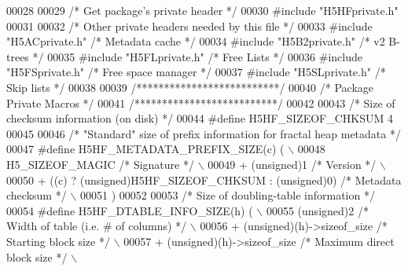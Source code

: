 \begin{DoxyCode}
00028 
00029 \textcolor{comment}{/* Get package's private header */}
00030 \textcolor{preprocessor}{#include "H5HFprivate.h"}
00031 
00032 \textcolor{comment}{/* Other private headers needed by this file */}
00033 \textcolor{preprocessor}{#include "H5ACprivate.h"}    \textcolor{comment}{/* Metadata cache           */}
00034 \textcolor{preprocessor}{#include "H5B2private.h"}    \textcolor{comment}{/* v2 B-trees               */}
00035 \textcolor{preprocessor}{#include "H5FLprivate.h"}    \textcolor{comment}{/* Free Lists                           */}
00036 \textcolor{preprocessor}{#include "H5FSprivate.h"}    \textcolor{comment}{/* Free space manager           */}
00037 \textcolor{preprocessor}{#include "H5SLprivate.h"}    \textcolor{comment}{/* Skip lists               */}
00038 
00039 \textcolor{comment}{/**************************/}
00040 \textcolor{comment}{/* Package Private Macros */}
00041 \textcolor{comment}{/**************************/}
00042 
00043 \textcolor{comment}{/* Size of checksum information (on disk) */}
00044 \textcolor{preprocessor}{#define H5HF\_SIZEOF\_CHKSUM      4}
00045 
00046 \textcolor{comment}{/* "Standard" size of prefix information for fractal heap metadata */}
00047 \textcolor{preprocessor}{#define H5HF\_METADATA\_PREFIX\_SIZE(c) (                                        \(\backslash\)}
00048 \textcolor{preprocessor}{    H5\_SIZEOF\_MAGIC   }\textcolor{comment}{/* Signature */}\textcolor{preprocessor}{                                         \(\backslash\)}
00049 \textcolor{preprocessor}{    + (unsigned)1 }\textcolor{comment}{/* Version */}\textcolor{preprocessor}{                                               \(\backslash\)}
00050 \textcolor{preprocessor}{    + ((c) ? (unsigned)H5HF\_SIZEOF\_CHKSUM : (unsigned)0) }\textcolor{comment}{/* Metadata checksum */}\textcolor{preprocessor}{ \(\backslash\)}
00051 \textcolor{preprocessor}{    )}
00052 
00053 \textcolor{comment}{/* Size of doubling-table information */}
00054 \textcolor{preprocessor}{#define H5HF\_DTABLE\_INFO\_SIZE(h) (                                            \(\backslash\)}
00055 \textcolor{preprocessor}{    (unsigned)2   }\textcolor{comment}{/* Width of table (i.e. # of columns) */}\textcolor{preprocessor}{                    \(\backslash\)}
00056 \textcolor{preprocessor}{    + (unsigned)(h)->sizeof\_size }\textcolor{comment}{/* Starting block size */}\textcolor{preprocessor}{                    \(\backslash\)}
00057 \textcolor{preprocessor}{    + (unsigned)(h)->sizeof\_size }\textcolor{comment}{/* Maximum direct block size */}\textcolor{preprocessor}{              \(\backslash\)}

\end{DoxyCode}
